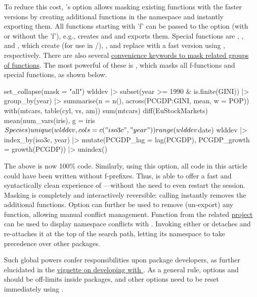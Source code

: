 \documentclass[nojss]{jss} %
\newcommand{\fct}[1]{\code{#1()}}
\begin{document}
To reduce this cost, 's  option allows masking existing  functions with the faster  versions by creating additional functions in the namespace and instantly exporting them. All  functions starting with 'f' can be passed to the option (with or without the 'f'), e.g.,  creates  and  and exports them. Special functions are , , and , which create  (for use in /), , and replace  with a fast version using \fct{fmatch}, respectively. There are also several \href{https://sebkrantz.github.io/collapse/reference/collapse-options.html}{convenience keywords to mask related groups of functions}. The most powerful of these is , which masks all f-functions and special functions, as shown below.
%
\begin{Code}
set_collapse(mask = "all")
wlddev |> subset(year >= 1990 & is.finite(GINI)) |>
  group_by(year) |>
  summarise(n = n(), across(PCGDP:GINI, mean, w = POP))
with(mtcars, table(cyl, vs, am))
sum(mtcars)
diff(EuStockMarkets)
mean(num_vars(iris), g = iris$Species)
unique(wlddev, cols = c("iso3c", "year"))
range(wlddev$date)
wlddev |> index_by(iso3c, year) |>
  mutate(PCGDP_lag = lag(PCGDP),
         PCGDP_growth = growth(PCGDP)) |> unindex()
\end{Code}
%
The above is now 100\%  code. Similarly, using this option, all code in this article could have been written without f-prefixes. Thus,  is able to offer a fast and syntactically clean experience of ---without the need to even restart the session. Masking is completely and interactively reversible: calling  instantly removes the additional functions. Option  can further be used to remove (un-export) any  function, allowing manual conflict management. Function  from the related \href{https://fastverse.github.io/fastverse/}{ project} \citep{rfastverse} can be used to display namespace conflicts with . Invoking either  or  detaches  and re-attaches it at the top of the search path, letting its namespace to take precedence over other packages. \newline

Such global powers confer responsibilities upon package developers, as further elucidated in the \href{https://sebkrantz.github.io/collapse/articles/developing_with_collapse.html#some-notes-on-global-options}{vignette on developing with }. As a general rule, options  and  should be off-limits inside packages, and other options need to be reset immediately using \fct{on.exit}.
%
\end{document}
